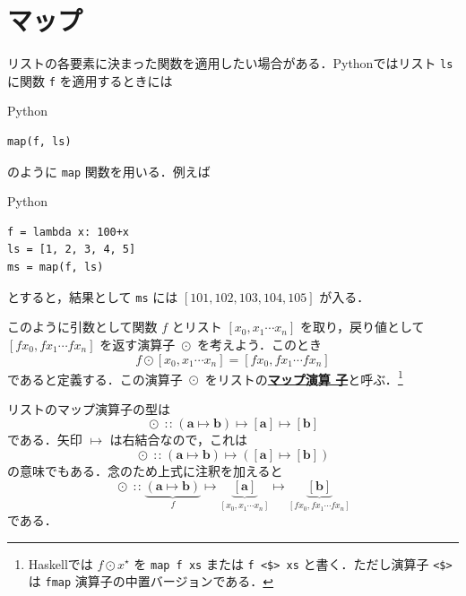 \documentclass[a5paper,twoside,fleqn,draft]{jsbook}
\newcommand{\programminglanguage}[1]{\textsf{#1}}
\newcommand{\haskell}{\programminglanguage{Haskell}}
\newcommand{\python}{\programminglanguage{Python}}
\newcommand{\keyword}[1]{{\underline{\textbf{#1}}}}
\newcommand{\code}[1]{\texttt{#1}}
\newenvironment{pythoncode}{\begin{itembox}[r]{\python}}{\end{itembox}}
\DeclareMathOperator{\mIn}{{:\!:}}
\DeclareMathOperator{\mMapList}{\odot}
\DeclareMathOperator{\mMapsTo}{\mapsto}
\newcommand{\mType}[1]{\mathbf{#1}}
\newcommand{\mListType}[1]{[\mType{#1}]}
\newcommand{\mListWith}[1]{\left[#1\right]}
\newcommand{\mList}[1]{{#1}^\mathrm{\star}}
\newcommand{\mProj}[2]{#1\mMapsTo#2}
\begin{document}
\section{マップ}

リストの各要素に決まった関数を適用したい場合がある．\python ではリスト
\code{ls} に関数 \code{f} を適用するときには
\begin{pythoncode}
\begin{verbatim}
map(f, ls)
\end{verbatim}
\end{pythoncode}
のように \code{map} 関数を用いる．例えば
\begin{pythoncode}
\begin{verbatim}
f = lambda x: 100+x
ls = [1, 2, 3, 4, 5]
ms = map(f, ls)
\end{verbatim}
\end{pythoncode}
とすると，結果として \code{ms} には $\mListWith{101,102,103,104,105}$
が入る．

このように引数として関数 $f$ とリスト $\mListWith{x_0,x_1\dotsb x_n}$
を取り，戻り値として $\mListWith{fx_0,fx_1\dotsb fx_n}$ を返す演算子
$\mMapList$ を考えよう．このとき
\begin{equation}
  f\mMapList\mListWith{x_0,x_1\dotsb x_n}
  =\mListWith{fx_0,fx_1\dotsb fx_n}
\end{equation}
であると定義する．この演算子 $\mMapList$ をリストの\keyword{マップ演算
  子}と呼ぶ．\footnote{\haskell では $f\mMapList\mList{x}$ を
  \code{map f xs} または \code{f <\$> xs} と書く．ただし演算子
  \code{<\$>} は \code{fmap} 演算子の中置バージョンである．}

リストのマップ演算子の型は
\begin{equation}
  \mMapList\mIn{}\mProj{(\mProj{\mType{a}}{\mType{b}})}
               {\mProj{\mListType{a}}{\mListType{b}}}
\end{equation}
である．矢印 $\mMapsTo$ は右結合なので，これは
\begin{equation}
  \mMapList\mIn{}\mProj{ (\mProj{\mType{a}}{\mType{b}}) } {
    (\mProj{\mListType{a}}{\mListType{b}}) }
\end{equation}
の意味でもある．念のため上式に注釈を加えると
\begin{equation}
  \mMapList\mIn\underbrace{\left(\mType{a}\mMapsTo\mType{b}\right)}_f
  \mMapsTo\underbrace{\mListType{a}}_{\mListWith{x_0,x_1\dotsb x_n}}
  \mMapsTo\underbrace{\mListType{b}}_{\mListWith{fx_0,fx_1\dotsb fx_n}}
\end{equation}
である．
\end{document}
